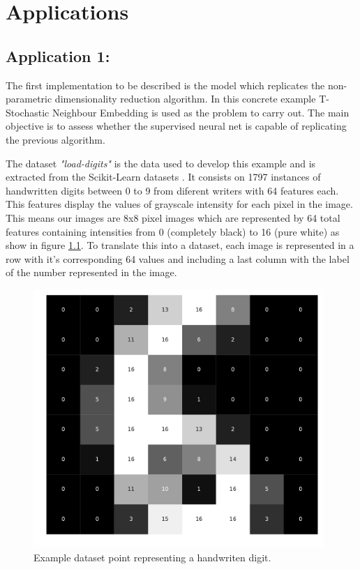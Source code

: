 \documentclass[a4paper,11pt,spanish]{report}
\begin{document}

\chapter{Applications}
\label{chap:app}

\section{Application 1:}
\label{sec:sup}

The first implementation to be described is the model which replicates the non-parametric dimensionality reduction algorithm. In this concrete example T-Stochastic Neighbour Embedding is used as the problem to carry out. The main objective is to assess whether the supervised neural net is capable of replicating the previous algorithm.

The dataset \textit{"load-digits"} is the data used to develop this example and is extracted from the Scikit-Learn datasets \citep{scikit-learn}. It consists on 1797 instances of handwritten digits between 0 to 9 from diferent writers with 64 features each. This features display the values of grayscale intensity for each pixel in the image. This means our images are 8x8 pixel images which are represented by 64 total features containing intensities from 0 (completely black) to 16 (pure white) as show in figure \ref{figuredigit}. To translate this into a dataset, each image is represented in a row with it's corresponding 64 values and including a last column with the label of the number represented in the image.
\begin{figure}[h]
\centering
\includegraphics[width=11cm]{figures/exampledigit.pdf}
\caption{\label{figuredigit}Example dataset point representing a handwriten digit.}
\end{figure}
\end{document}
